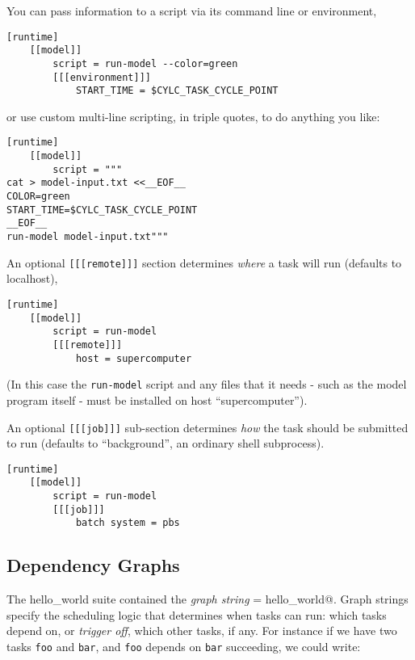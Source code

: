 You can pass information to a script via its command line or environment,

\begin{lstlisting}[language=suiterc]
[runtime]
    [[model]]
        script = run-model --color=green
        [[[environment]]]
            START_TIME = $CYLC_TASK_CYCLE_POINT
\end{lstlisting}

or use custom multi-line scripting, in triple quotes, to do anything you like:
\begin{lstlisting}[language=suiterc]
[runtime]
    [[model]]
        script = """
cat > model-input.txt <<__EOF__
COLOR=green
START_TIME=$CYLC_TASK_CYCLE_POINT
__EOF__
run-model model-input.txt"""
\end{lstlisting}

An optional \lstinline=[[[remote]]]= section determines {\em where} a task
will run (defaults to localhost), 

\begin{lstlisting}[language=suiterc]
[runtime]
    [[model]]
        script = run-model
        [[[remote]]]
            host = supercomputer
\end{lstlisting}
(In this case the \lstinline=run-model= script and any files that it needs -
such as the model program itself - must be installed on host ``supercomputer'').

An optional \lstinline=[[[job]]]= sub-section determines {\em how} the task
should be submitted to run (defaults to ``background'', an ordinary shell
subprocess).
\begin{lstlisting}[language=suiterc]
[runtime]
    [[model]]
        script = run-model
        [[[job]]]
            batch system = pbs
\end{lstlisting}


\subsection{Dependency Graphs}

The hello\_world suite contained the {\em graph string}
\lstinline@graph = hello_world@.  Graph strings specify the scheduling logic
that determines when tasks can run: which tasks depend on, or {\em trigger off},
which other tasks, if any.  For instance if we have two tasks \lstinline{foo}
and \lstinline{bar}, and \lstinline{foo} depends on \lstinline{bar} succeeding,
we could write:

